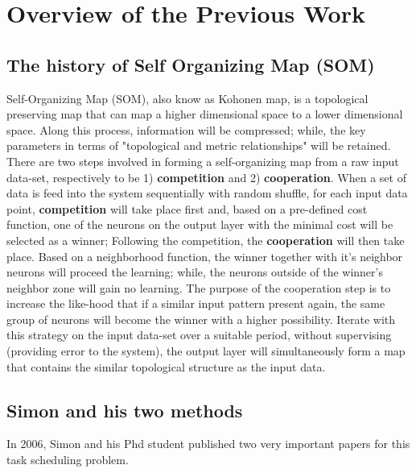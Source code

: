 \chapter{Overview of the Previous Work}

\section{The history of Self Organizing Map (SOM)}
Self-Organizing Map (SOM), also know as Kohonen map, is a topological preserving map that can map a higher dimensional space to a lower dimensional space. Along this process, information will be compressed; while, the key parameters in terms of "topological and metric relationships"\cite{Kohonen1998} will be retained. 
\\
There are two steps involved in forming a self-organizing map from a raw input data-set\cite{hebbian2007}, respectively to be 1) \textbf{competition} and 2) \textbf{cooperation}. When a set of data is feed into the system sequentially with random shuffle, for each input data point, \textbf{competition} will take place first and, based on a pre-defined cost function, one of the neurons on the output layer with the minimal cost will be selected as a winner; Following the competition, the  \textbf{cooperation} will then take place. Based on a neighborhood function, the winner together with it's neighbor neurons will proceed the learning; while, the neurons outside of the winner's neighbor zone will gain no learning. The purpose of the cooperation step is to increase the like-hood that if a similar input pattern present again, the same group of neurons will become the winner with a higher possibility. Iterate with this strategy on the input data-set over a suitable period, without supervising (providing error to the system), the output layer will simultaneously form a map that contains the similar topological structure as the input data. 

\section{Simon and his two methods}
In 2006, Simon and his Phd student published two very important papers for this task scheduling problem.

